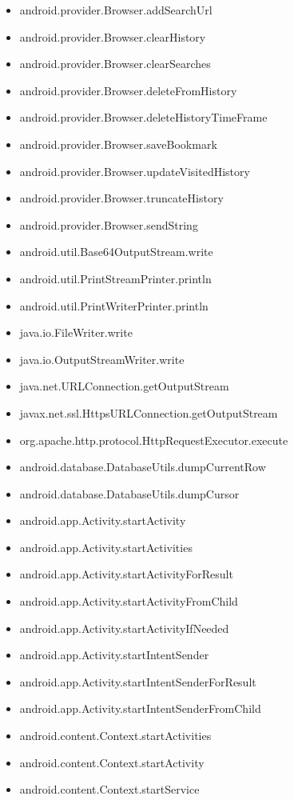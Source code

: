 \documentclass{sig-alternate}
\begin{document}
\begin{itemize}
\item android.provider.Browser.addSearchUrl
\item android.provider.Browser.clearHistory
\item android.provider.Browser.clearSearches
\item android.provider.Browser.deleteFromHistory
\item android.provider.Browser.deleteHistoryTimeFrame
\item android.provider.Browser.saveBookmark
\item android.provider.Browser.updateVisitedHistory
\item android.provider.Browser.truncateHistory
\item android.provider.Browser.sendString
\item android.util.Base64OutputStream.write
\item android.util.PrintStreamPrinter.println
\item android.util.PrintWriterPrinter.println
\item java.io.FileWriter.write
\item java.io.OutputStreamWriter.write
\item java.net.URLConnection.getOutputStream
\item javax.net.ssl.HttpsURLConnection.getOutputStream
\item org.apache.http.protocol.HttpRequestExecutor.execute
\item android.database.DatabaseUtils.dumpCurrentRow
\item android.database.DatabaseUtils.dumpCursor
\item android.app.Activity.startActivity
\item android.app.Activity.startActivities
\item android.app.Activity.startActivityForResult
\item android.app.Activity.startActivityFromChild
\item android.app.Activity.startActivityIfNeeded
\item android.app.Activity.startIntentSender
\item android.app.Activity.startIntentSenderForResult
\item android.app.Activity.startIntentSenderFromChild
\item android.content.Context.startActivities
\item android.content.Context.startActivity
\item android.content.Context.startService

\end{itemize}
\end{document}
